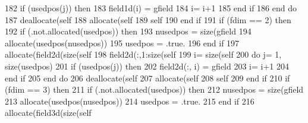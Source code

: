\begin{DoxyCode}
182                 \textcolor{keywordflow}{if} (usedpos(j)) \textcolor{keywordflow}{then}
183                     field1d(i) = gfield%
184                     i= i+1
185 \textcolor{keywordflow}{                end if}
186 \textcolor{keywordflow}{            end do}
187             \textcolor{keyword}{deallocate}(self%
188             \textcolor{keyword}{allocate}(self%
189             self%
190 \textcolor{keywordflow}{        end if}
191         \textcolor{keywordflow}{if} (fdim == 2) \textcolor{keywordflow}{then}
192             \textcolor{keywordflow}{if} (.not.\textcolor{keyword}{allocated}(usedpos)) \textcolor{keywordflow}{then}
193                 nusedpos = \textcolor{keyword}{size}(gfield%
194                 \textcolor{keyword}{allocate}(usedpos(nusedpos))
195                 usedpos = .true.
196 \textcolor{keywordflow}{            end if}
197             \textcolor{keyword}{allocate}(field2d(\textcolor{keyword}{size}(self%
198             field2d(:,1:\textcolor{keyword}{size}(self%
199             i= \textcolor{keyword}{size}(self%
200             \textcolor{keywordflow}{do} j= 1, \textcolor{keyword}{size}(usedpos)
201                 \textcolor{keywordflow}{if} (usedpos(j)) \textcolor{keywordflow}{then}
202                     field2d(:, i) = gfield%
203                     i= i+1
204 \textcolor{keywordflow}{                end if}
205 \textcolor{keywordflow}{            end do}            
206             \textcolor{keyword}{deallocate}(self%
207             \textcolor{keyword}{allocate}(self%
208             self%
209 \textcolor{keywordflow}{        end if}
210         \textcolor{keywordflow}{if} (fdim == 3) \textcolor{keywordflow}{then}
211             \textcolor{keywordflow}{if} (.not.\textcolor{keyword}{allocated}(usedpos)) \textcolor{keywordflow}{then}
212                 nusedpos = \textcolor{keyword}{size}(gfield%
213                 \textcolor{keyword}{allocate}(usedpos(nusedpos))
214                 usedpos = .true.
215 \textcolor{keywordflow}{            end if}
216             \textcolor{keyword}{allocate}(field3d(\textcolor{keyword}{size}(self%

\end{DoxyCode}

